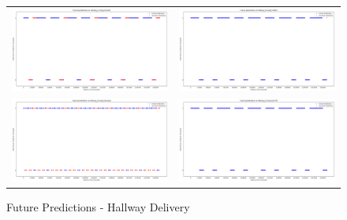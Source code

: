 \begin{figure}
  \begin{tabular}{cc}
    {\includegraphics[width = 3in]{images/results/Future_hallway_D_Duckett.png}} &
    {\includegraphics[width = 3in]{images/results/Future_hallway_D_FreMEn.png}} \\
    {\includegraphics[width = 3in]{images/results/Future_hallway_D_Gaussian.png}} &
    {\includegraphics[width = 3in]{images/results/Future_hallway_D_HyT-EM.png}} \\
  \end{tabular}
  \caption{Future Predictions - Hallway Delivery}
\end{figure}\\ \\

